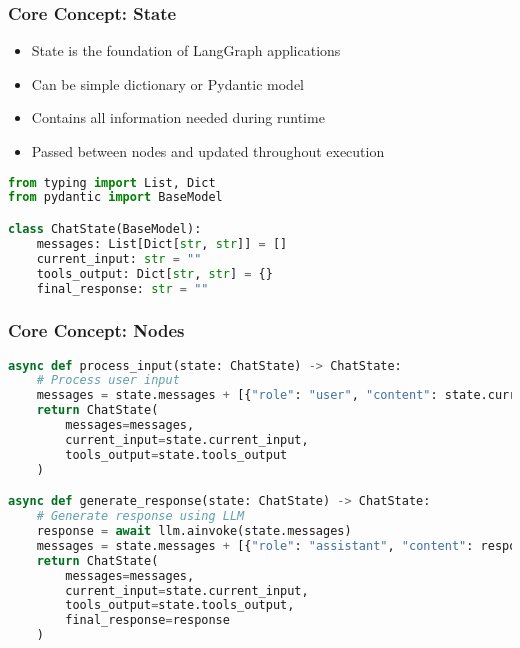 \begin{frame}[fragile]\frametitle{Core Concept: State}

      \begin{itemize}
        \item State is the foundation of LangGraph applications
        \item Can be simple dictionary or Pydantic model
        \item Contains all information needed during runtime
        \item Passed between nodes and updated throughout execution
      \end{itemize}
	  
      \begin{lstlisting}[language=Python, basicstyle=\small]
from typing import List, Dict
from pydantic import BaseModel

class ChatState(BaseModel):
    messages: List[Dict[str, str]] = []
    current_input: str = ""
    tools_output: Dict[str, str] = {}
    final_response: str = ""
      \end{lstlisting}

\end{frame}

\begin{frame}[fragile]\frametitle{Core Concept: Nodes}
      \begin{lstlisting}[language=Python, basicstyle=\small]
async def process_input(state: ChatState) -> ChatState:
    # Process user input
    messages = state.messages + [{"role": "user", "content": state.current_input}]
    return ChatState(
        messages=messages,
        current_input=state.current_input,
        tools_output=state.tools_output
    )

async def generate_response(state: ChatState) -> ChatState:
    # Generate response using LLM
    response = await llm.ainvoke(state.messages)
    messages = state.messages + [{"role": "assistant", "content": response}]
    return ChatState(
        messages=messages,
        current_input=state.current_input,
        tools_output=state.tools_output,
        final_response=response
    )
      \end{lstlisting}
\end{frame}

